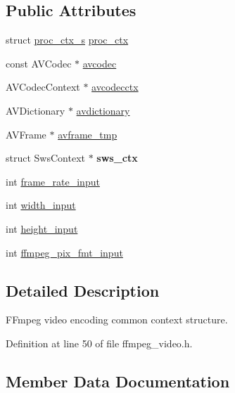 \subsection*{Public Attributes}
\begin{DoxyCompactItemize}
\item 
struct \hyperlink{structproc__ctx__s}{proc\+\_\+ctx\+\_\+s} \hyperlink{structffmpeg__video__enc__ctx__s_a44328c80df7eae90b06840a077e60ef3}{proc\+\_\+ctx}
\item 
const A\+V\+Codec $\ast$ \hyperlink{structffmpeg__video__enc__ctx__s_aefc9d1d9d634d2421b08663361857713}{avcodec}
\item 
A\+V\+Codec\+Context $\ast$ \hyperlink{structffmpeg__video__enc__ctx__s_ab16e6b1a593cd2e0439c3ba66524793c}{avcodecctx}
\item 
A\+V\+Dictionary $\ast$ \hyperlink{structffmpeg__video__enc__ctx__s_a18bd2ee272daabc7beeedc3a4de58b16}{avdictionary}
\item 
A\+V\+Frame $\ast$ \hyperlink{structffmpeg__video__enc__ctx__s_a8add1858adf9ad2275ec42a6097f3b4d}{avframe\+\_\+tmp}
\item 
struct Sws\+Context $\ast$ {\bfseries sws\+\_\+ctx}\hypertarget{structffmpeg__video__enc__ctx__s_a889bcf1403d6a7c7478773bbd181ef71}{}\label{structffmpeg__video__enc__ctx__s_a889bcf1403d6a7c7478773bbd181ef71}

\item 
int \hyperlink{structffmpeg__video__enc__ctx__s_a94b8f1af5d95331dc23828ef3e1db400}{frame\+\_\+rate\+\_\+input}
\item 
int \hyperlink{structffmpeg__video__enc__ctx__s_ae173fc838cf18ead8354f51db4d7aec6}{width\+\_\+input}
\item 
int \hyperlink{structffmpeg__video__enc__ctx__s_a2c82f6dae841d2a04b4f448150c58d76}{height\+\_\+input}
\item 
int \hyperlink{structffmpeg__video__enc__ctx__s_a6e70489ea3eece6d4b9fe3e3d23cab11}{ffmpeg\+\_\+pix\+\_\+fmt\+\_\+input}
\end{DoxyCompactItemize}


\subsection{Detailed Description}
F\+Fmpeg video encoding common context structure. 

Definition at line 50 of file ffmpeg\+\_\+video.\+h.



\subsection{Member Data Documentation}
